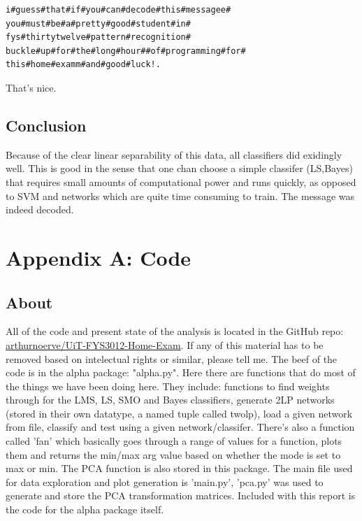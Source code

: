 \documentclass[12pt, a4paper]{article}
\begin{document}
\begin{center}
\begin{verbatim}
i#guess#that#if#you#can#decode#this#messagee#
you#must#be#a#pretty#good#student#in#
fys#thirtytwelve#pattern#recognition#
buckle#up#for#the#long#hour##of#programming#for#
this#home#examm#and#good#luck!. 
\end{verbatim}

\end{center}

That's nice.

\subsection{Conclusion }
Because of the clear linear separability of this data, all classifiers did exidingly well. This is good in the sense that one chan choose a simple classifer (LS,Bayes) that requires small amounts of computational power and runs quickly, as opposed to SVM and networks which are quite time consuming to train. The message was indeed decoded.









\section{ Appendix A: Code}
\subsection{About}
All of the code and present state of the analysis is located in the GitHub repo: \href{https://github.com/arthurnoerve/UiT-FYS3012-Home-Exam}{arthurnoerve/UiT-FYS3012-Home-Exam}. If any of this material has to be removed based on intelectual rights or similar, please tell me. The beef of the code is in the alpha package: "alpha.py". Here there are functions that do most of the things we have been doing here. They include: functions to find weights through for the LMS, LS, SMO and Bayes classifiers, generate 2LP networks (stored in their own datatype, a named tuple called twolp), load a given network from file, classify and test using a given network/classifer. There's also a function called 'fan' which basically goes through a range of values for a function, plots them and returns the min/max arg value based on whether the mode is set to max or min. The PCA function is also stored in this package. The main file used for data exploration and plot generation is 'main.py', 'pca.py' was used to generate and store the PCA transformation matrices. Included with this report is the code for the alpha package itself.
\end{document}
